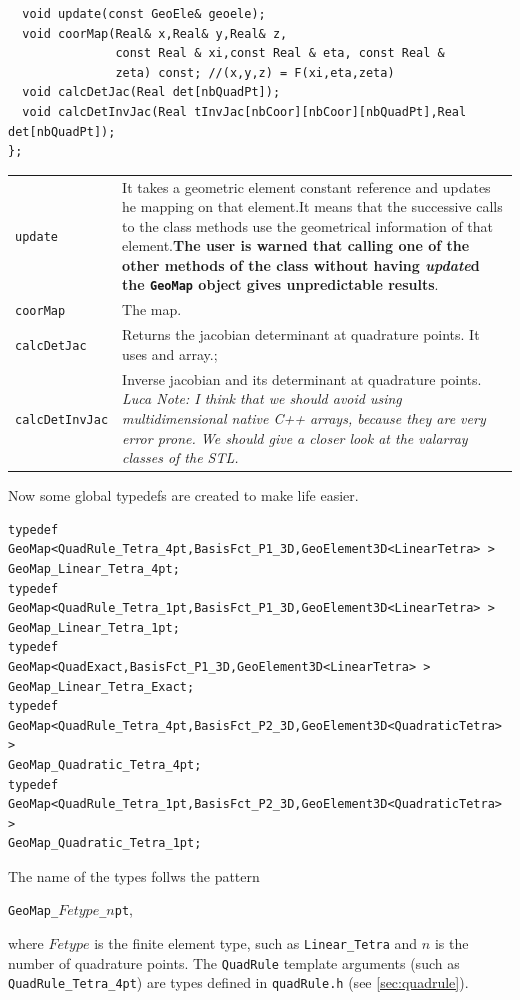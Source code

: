 \begin{verbatim}
  void update(const GeoEle& geoele);
  void coorMap(Real& x,Real& y,Real& z,
               const Real & xi,const Real & eta, const Real &
               zeta) const; //(x,y,z) = F(xi,eta,zeta)
  void calcDetJac(Real det[nbQuadPt]);
  void calcDetInvJac(Real tInvJac[nbCoor][nbCoor][nbQuadPt],Real det[nbQuadPt]);
};
\end{verbatim}
\begin{tabularx}{\textwidth}{lX}
  \hline \texttt{update}& It takes a geometric element constant
  reference and updates he mapping on that element.It means that the
  successive calls to the class methods use the geometrical
  information of that element.\textbf{The user is warned that calling
    one of the other methods of the class without having
    \emph{update}d the \texttt{GeoMap} object gives unpredictable results}.\\
  \texttt{coorMap} & The map.\\
  \texttt{calcDetJac} & Returns the jacobian determinant at
  quadrature points. It uses and array.;\\
  \texttt{calcDetInvJac} & Inverse jacobian and its determinant at
  quadrature  points.  \textsl{Luca Note: I think that we should avoid using
    multidimensional native C++ arrays, because they are very error
    prone. We should give a closer look
    at the valarray classes of the STL.}\\
  \hline
\end{tabularx}
Now some global typedefs are created to make life easier.

\begin{verbatim}
typedef
GeoMap<QuadRule_Tetra_4pt,BasisFct_P1_3D,GeoElement3D<LinearTetra> >
GeoMap_Linear_Tetra_4pt;
typedef
GeoMap<QuadRule_Tetra_1pt,BasisFct_P1_3D,GeoElement3D<LinearTetra> >
GeoMap_Linear_Tetra_1pt;
typedef
GeoMap<QuadExact,BasisFct_P1_3D,GeoElement3D<LinearTetra> >
GeoMap_Linear_Tetra_Exact;
typedef
GeoMap<QuadRule_Tetra_4pt,BasisFct_P2_3D,GeoElement3D<QuadraticTetra> >
GeoMap_Quadratic_Tetra_4pt;
typedef
GeoMap<QuadRule_Tetra_1pt,BasisFct_P2_3D,GeoElement3D<QuadraticTetra> >
GeoMap_Quadratic_Tetra_1pt;
\end{verbatim}
The name of the types follws the pattern
\begin{center}
\mbox{\texttt{GeoMap\_}$Fetype$\texttt{\_}$n$\texttt{pt}},
\end{center}
where $Fetype$ is the finite element type, such as \texttt{Linear\_Tetra}
and $n$ is the number of quadrature points.
The \texttt{QuadRule} template arguments (such as \texttt{QuadRule\_Tetra\_4pt})
are types defined in \texttt{quadRule.h} (see \ref{sec:quadrule}).

